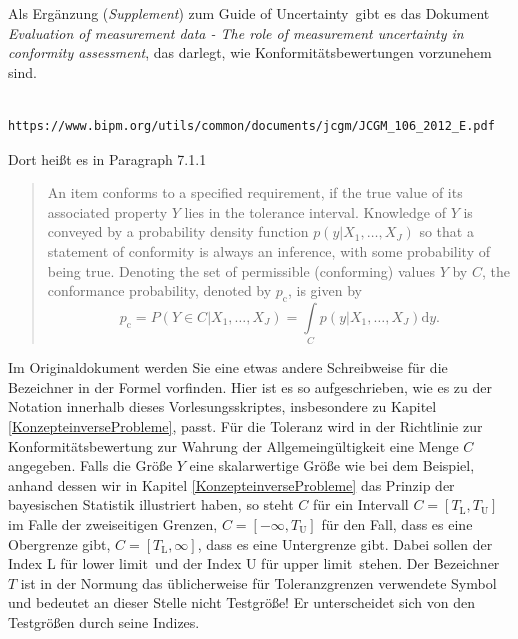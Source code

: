Als Ergänzung (\textsl{Supplement}) zum \glqq Guide of Uncertainty\grqq ~gibt es das Dokument
\textsl{Evaluation of measurement data - The role of measurement uncertainty in conformity assessment},
das darlegt, wie Konformitätsbewertungen vorzunehem sind.
\begin{verbatim}
	https://www.bipm.org/utils/common/documents/jcgm/JCGM_106_2012_E.pdf
\end{verbatim}
Dort heißt es in Paragraph 7.1.1
\begin{quote}
	An item conforms to a specified requirement,
	if the true value of its associated property $Y$ lies in the tolerance
	interval. Knowledge of $Y$ is conveyed by a probability density function $p(y|{X_1,\dots,X_J})$
	so that a statement of conformity is always an inference,
	with some probability of being true. Denoting the set of permissible (conforming) values
	$Y$ by $C$, the conformance probability, denoted by $p_\mathrm{c}$, is given by
	\begin{equation}
		p_\mathrm{c} = P(Y \in C | {X_1,\dots,X_J}) = \int\limits_C p(y|{X_1,\dots,X_J}) \mathrm{d}y.
	\end{equation}
\end{quote}
Im Originaldokument werden Sie eine etwas andere Schreibweise für die Bezeichner in der Formel vorfinden.
Hier ist es so aufgeschrieben, wie es zu der Notation innerhalb dieses Vorlesungsskriptes, insbesondere
zu Kapitel \ref{KonzepteinverseProbleme}, passt.
Für die Toleranz wird in der Richtlinie zur Konformitätsbewertung zur Wahrung der Allgemeingültigkeit
eine Menge $C$ angegeben. Falls die Größe $Y$ eine skalarwertige Größe wie bei dem Beispiel, anhand dessen
wir in Kapitel \ref{KonzepteinverseProbleme} das Prinzip der bayesischen Statistik illustriert haben,
so steht $C$ für ein Intervall $C = [T_\mathrm{L}, T_\mathrm{U}]$ im Falle der zweiseitigen
Grenzen, $C = [-\infty, T_\mathrm{U}]$ für den Fall, dass es eine Obergrenze gibt,
$C = [T_\mathrm{L}, \infty]$, dass es eine Untergrenze gibt. Dabei sollen der Index L für \glqq lower
limit\grqq ~und der Index U für \glqq upper limit\grqq ~stehen. Der Bezeichner $T$ ist in der
Normung das üblicherweise für Toleranzgrenzen verwendete Symbol und bedeutet an dieser
Stelle nicht Testgröße! Er unterscheidet sich von den Testgrößen durch seine Indizes.

